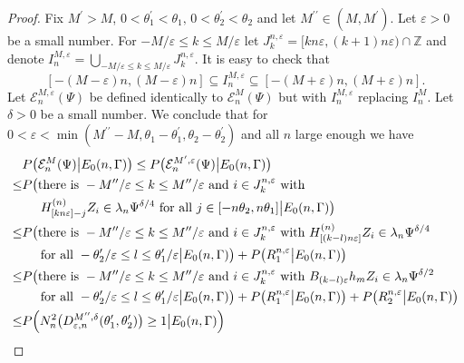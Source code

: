 \documentclass[10pt,a4paper]{amsart}
\newcommand{\ZZ}{\mathbb{Z}}
\newcommand{\cE}{\mathcal{E}}
\newcommand{\eps}{\varepsilon}
\begin{document}
\begin{proof}
Fix   $M^\prime >M$, $   0<\theta_1^\prime<\theta_1, \,
0<\theta_2^\prime<\theta_2$ and let 
$M^{\prime\prime}\in (M,M^\prime)$. 
Let $\eps>0$ be a small number. For $-M/\eps\leq k\leq M/\eps$ let $J_k^{n, \eps} =
        [kn\eps, (k+1) n\eps) \cap \ZZ$ and denote $I_n^{M,\eps} =
        \bigcup_{-M/\eps\leq k\leq M/\eps} J_k^{n, \eps} $.  It is
        easy to check that
$$
[-(M-\eps)n,(M-\eps)n]\subseteq        I_n^{M,\eps} \subseteq
[-(M+\eps)n,(M+\eps)n].
$$
Let $\cE_n^{M,\eps}(\Psi)$ be defined identically to $\cE_n^M(\Psi)$
but with  $I_n^{M,\eps}$ replacing $I_n^M$. Let $\delta>0$ be a small
number. We conclude that for $0<\eps<\min(M^{\prime\prime} -M,
\theta_1-\theta_1^\prime, \theta_2-\theta_2^\prime)$ 
and all $n$ large
enough we have
\begin{align*}
 &P\bigl(\cE_n^M(\Psi) \big|E_0(n,\Gamma)\bigr) \leq 
  P\bigl(\cE_n^{M^\prime,\eps}(\Psi) \big|E_0(n,\Gamma)\bigr) \\
  \leq &P\bigl( \text{there is} \ -M^{\prime\prime}/\eps \leq k\leq
                    M^{\prime\prime}/\eps \ \text{and} \ i\in J_k^{n,
   \eps} \ \text{with}  \\
                  & \hskip 0.2in H^{(n)}_{[kn\eps]-j} Z_i\in \lambda_n \Psi^{\delta/4} \
                   \text{for all} \  j\in [-n\theta_2,n\theta_1] \big|E_0(n,\Gamma)\bigr)\\
\leq &P\bigl( \text{there is} \ -M^{\prime\prime}/\eps \leq k\leq
                    M^{\prime\prime}/\eps \ \text{and} \ i\in J_k^{n,
   \eps} \ \text{with}  \ H^{(n)}_{[(k-l)n\eps]} Z_i\in \lambda_n \Psi^{\delta/4} \\
                  & \hskip 0.2in 
                   \text{for all} \   -\theta_2^\prime/\eps\leq l\leq \theta_1^\prime/\eps \big|E_0(n,\Gamma)\bigr)
                    + P\bigl( R_1^{n, \eps}\big|E_0(n,\Gamma)\bigr)\\
\leq &P\bigl( \text{there is} \ -M^{\prime\prime}/\eps \leq k\leq
                    M^{\prime\prime}/\eps \ \text{and} \ i\in J_k^{n,
   \eps} \ \text{with}  \ B_{(k-l)\eps}h_m Z_i\in \lambda_n \Psi^{\delta/2} \\
                  & \hskip 0.2in  
                   \text{for all} \   -\theta_2^\prime/\eps\leq l\leq \theta_1^\prime/\eps \big|E_0(n,\Gamma)\bigr)
                    + P\bigl( R_1^{n,
                    \eps}\big|E_0(n,\Gamma)\bigr)+P\bigl( R_2^{n,
                    \eps}\big|E_0(n,\Gamma)\bigr) \\
\leq &P\Bigl( N_n^2\bigl(D_{\eps,n}^{M^{\prime\prime},\delta}(\theta_1^\prime,\theta_2^\prime)\bigr)\geq 1\big| E_0(n,\Gamma)\Bigr)

\end{align*}
\end{proof}
\end{document}
